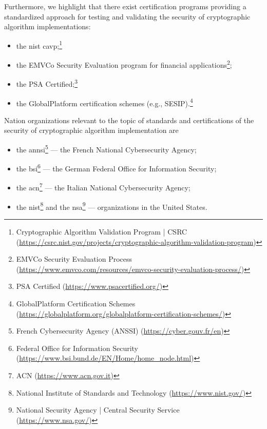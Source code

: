 Furthermore, we highlight that there exist certification programs providing a standardized approach for testing and validating the security of cryptographic algorithm implementations:
\begin{itemize}
	\item the \gls{nist} \gls{cavp};\footnote{Cryptographic Algorithm Validation Program | CSRC (\url{https://csrc.nist.gov/projects/cryptographic-algorithm-validation-program})}
	\item the EMVCo Security Evaluation program for financial applications\footnote{EMVCo Security Evaluation Process (\url{https://www.emvco.com/resources/emvco-security-evaluation-process/})};
	\item the PSA Certified;\footnote{PSA Certified (\url{https://www.psacertified.org/})}
	\item the GlobalPlatform certification schemes (e.g., SESIP).\footnote{GlobalPlatform Certification Schemes (\url{https://globalplatform.org/globalplatform-certification-schemes/})}
\end{itemize}


Nation organizations relevant to the topic of standards and certifications of the security of cryptographic algorithm implementation are 
\begin{itemize}
	\item the \gls{annsi}\footnote{French Cybersecurity Agency (ANSSI) (\url{https://cyber.gouv.fr/en})} --- the French National Cybersecurity Agency;
	\item the \gls{bsi}\footnote{Federal Office for Information Security (\url{https://www.bsi.bund.de/EN/Home/home_node.html})} --- the German Federal Office for Information Security;
	\item the \gls{acn}\footnote{ACN (\url{https://www.acn.gov.it})} --- the Italian National Cybersecurity Agency;
	\item the \gls{nist}\footnote{National Institute of Standards and Technology (\url{https://www.nist.gov/})} and the \gls{nsa}\footnote{National Security Agency | Central Security Service (\url{https://www.nsa.gov/})} --- organizations in the United States.
\end{itemize}


